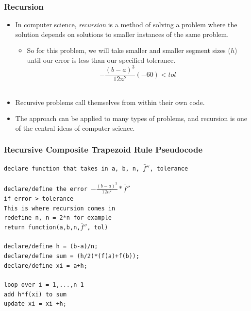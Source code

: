 \documentclass{if-beamer}
\begin{document}
\begin{frame}[t]
	\frametitle{Recursion}
	\begin{itemize}
		\item In computer science, \textit{recursion} is a method of solving a problem where the solution depends on solutions to smaller instances of the same problem. \\\vspace{10pt}
		\begin{itemize}
			\item So for this problem, we will take smaller and smaller segment sizes ($h$) until our error is less than our specified tolerance.$$-\frac{(b-a)^3}{12n^2}(-60) < tol $$\\\vspace{10pt}
		\end{itemize}
		\item Recursive problems call themselves from within their own code. \\\vspace{10pt} 
		\item The approach can be applied to many types of problems, and recursion is one of the central ideas of computer science.
	\end{itemize}
\end{frame}

\begin{frame}
	\frametitle{Recursive Composite Trapezoid Rule Pseudocode}
	\texttt{declare function that takes in a, b, n, $\bar{f}''$, tolerance}\\
	\texttt{ }
	\\\texttt{declare/define the error $-\frac{(b-a)^3}{12n^2}* \bar{f}''$}\\\vspace{2pt}
	\texttt{if error > tolerance}\\
	\texttt{This is where recursion comes in}\\
	\texttt{\qquad redefine n, n = 2*n for example}\\
	\texttt{\qquad return function(a,b,n,$\bar{f}''$, tol)}\\
	\texttt{ } \\
	\texttt{declare/define h = (b-a)/n;}\\
	\texttt{declare/define sum = (h/2)*(f(a)+f(b)); }\\
	\texttt{declare/define xi = a+h;}\\
	\texttt{ }\\
	\texttt{loop over i = 1,...,n-1 }\\
	\texttt{\qquad add h*f(xi) to sum} \\
	\texttt{\qquad update xi = xi +h;}\\
\end{frame}	
\end{document}
